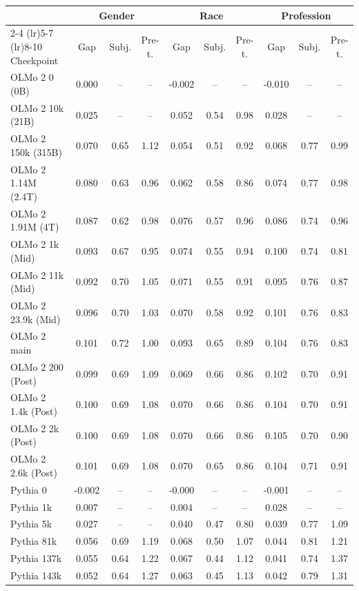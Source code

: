 \begin{tabular}{lccccccccc}
\toprule
 & \multicolumn{3}{c}{Gender} & \multicolumn{3}{c}{Race} & \multicolumn{3}{c}{Profession} \\
\cmidrule(lr){2-4} \cmidrule(lr){5-7} \cmidrule(lr){8-10}
Checkpoint & Gap & Subj. & Pre-t. & Gap & Subj. & Pre-t. & Gap & Subj. & Pre-t. \\
\midrule
OLMo 2 0 (0B) & 0.000 & -- & -- & -0.002 & -- & -- & -0.010 & -- & -- \\
OLMo 2 10k (21B) & 0.025 & -- & -- & 0.052 & 0.54 & 0.98 & 0.028 & -- & -- \\
OLMo 2 150k (315B) & 0.070 & 0.65 & 1.12 & 0.054 & 0.51 & 0.92 & 0.068 & 0.77 & 0.99 \\
OLMo 2 1.14M (2.4T) & 0.080 & 0.63 & 0.96 & 0.062 & 0.58 & 0.86 & 0.074 & 0.77 & 0.98 \\
OLMo 2 1.91M (4T) & 0.087 & 0.62 & 0.98 & 0.076 & 0.57 & 0.96 & 0.086 & 0.74 & 0.96 \\
OLMo 2 1k (Mid) & 0.093 & 0.67 & 0.95 & 0.074 & 0.55 & 0.94 & 0.100 & 0.74 & 0.81 \\
OLMo 2 11k (Mid) & 0.092 & 0.70 & 1.05 & 0.071 & 0.55 & 0.91 & 0.095 & 0.76 & 0.87 \\
OLMo 2 23.9k (Mid) & 0.096 & 0.70 & 1.03 & 0.070 & 0.58 & 0.92 & 0.101 & 0.76 & 0.83 \\
OLMo 2 main & 0.101 & 0.72 & 1.00 & 0.093 & 0.65 & 0.89 & 0.104 & 0.76 & 0.83 \\
OLMo 2 200 (Post) & 0.099 & 0.69 & 1.09 & 0.069 & 0.66 & 0.86 & 0.102 & 0.70 & 0.91 \\
OLMo 2 1.4k (Post) & 0.100 & 0.69 & 1.08 & 0.070 & 0.66 & 0.86 & 0.104 & 0.70 & 0.91 \\
OLMo 2 2k (Post) & 0.100 & 0.69 & 1.08 & 0.070 & 0.66 & 0.86 & 0.105 & 0.70 & 0.90 \\
OLMo 2 2.6k (Post) & 0.101 & 0.69 & 1.08 & 0.070 & 0.65 & 0.86 & 0.104 & 0.71 & 0.91 \\
Pythia 0 & -0.002 & -- & -- & -0.000 & -- & -- & -0.001 & -- & -- \\
Pythia 1k & 0.007 & -- & -- & 0.004 & -- & -- & 0.028 & -- & -- \\
Pythia 5k & 0.027 & -- & -- & 0.040 & 0.47 & 0.80 & 0.039 & 0.77 & 1.09 \\
Pythia 81k & 0.056 & 0.69 & 1.19 & 0.068 & 0.50 & 1.07 & 0.044 & 0.81 & 1.21 \\
Pythia 137k & 0.055 & 0.64 & 1.22 & 0.067 & 0.44 & 1.12 & 0.041 & 0.74 & 1.37 \\
Pythia 143k & 0.052 & 0.64 & 1.27 & 0.063 & 0.45 & 1.13 & 0.042 & 0.79 & 1.31 \\
\bottomrule
\end{tabular}
